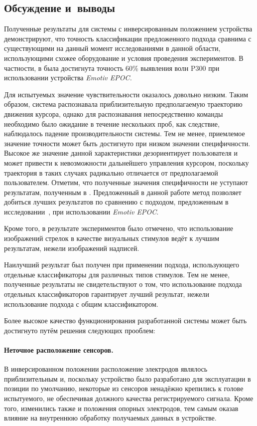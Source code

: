 \documentclass[12pt,a4paper,oneside,fleqn,leqno]{article}
\begin{document}
\subsection{Обсуждение и~выводы}
	\par Полученные результаты для системы с инверсированным положением устройства демонстрируют, что точность классификации предложенного подхода сравнима с существующими на данный момент исследованиями в данной области, использующими схожее оборудование и условия проведения экспериментов. В частности, в \cite{rhyme} была достигнута точность 60\% выявления волн P300 при использовании устройства {\it Emotiv EPOC.}
	\par Для испытуемых значение чувствительности оказалось довольно низким. Таким образом, система распознавала приблизительную предполагаемую траекторию движения курсора, однако для распознавания непосредственно команды необходимо было ожидание в течение нескольких проб, как следствие, наблюдалось падение производительности системы. Тем не менее, приемлемое значение точности может быть достигнуто при низком значении специфичности. Высокое же значение данной характеристики дезориентирует пользователя и может привести к невозможности дальнейшего управления курсором, поскольку траектория в таких случаях радикально отличается от предполагаемой пользователем. Отметим, что полученные значения специфичности не уступают результатам, полученным в \cite{Kanoh}. Предложенный в данной работе метод позволяет добиться лучших результатов по сравнению с подходом, предложенным в исследовании~\cite{pseudo}, при использовании {\it Emotiv EPOC}. 
	\par Кроме того, в результате экспериментов было отмечено, что использование изображений стрелок в качестве визуальных стимулов ведёт к лучшим результатам, нежели изображений надписей.
	\par Наилучший результат был получен при применении подхода, использующего отдельные классификаторы для различных типов стимулов. Тем не менее, полученные результаты не свидетельствуют о том, что использование подхода отдельных классификаторов гарантирует лучший результат, нежели использование подхода с общим классификатором.
	\par Более высокое качество функционирования разработанной системы может быть достигнуто путём решения следующих прооблем:
	\paragraph{Неточное расположение сенсоров.}
	\par В инверсированном положении расположение электродов являлось приблизительным и, поскольку устройство было разработано для эксплуатации в позиции по умолчанию, некоторые из сенсоров ненадёжно крепились к голове испытуемого, не обеспечивая должного качества регистрируемого сигнала. Кроме того, изменились также и положения опорных электродов, тем самым оказав влияние на внутреннюю обработку получаемых данных в устройстве.
\end{document}

